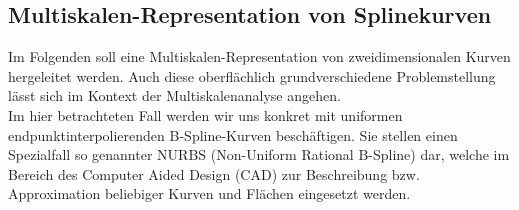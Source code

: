 \subsection{Multiskalen-Representation von Splinekurven}
%
%
%
%
Im Folgenden soll eine Multiskalen-Representation von zweidimensionalen Kurven hergeleitet werden. Auch diese oberflächlich grundverschiedene Problemstellung lässt sich im Kontext der Multiskalenanalyse angehen. \\
%
Im hier betrachteten Fall werden wir uns konkret mit uniformen endpunktinterpolierenden B-Spline-Kurven beschäftigen. Sie stellen einen Spezialfall so genannter NURBS (Non-Uniform Rational B-Spline) dar, welche im Bereich des Computer Aided Design (CAD) zur Beschreibung bzw. Approximation beliebiger Kurven und Flächen eingesetzt werden.
%
